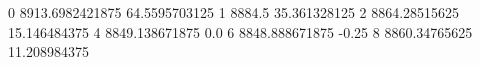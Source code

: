 0 8913.6982421875 64.5595703125
1 8884.5 35.361328125
2 8864.28515625 15.146484375
4 8849.138671875 0.0
6 8848.888671875 -0.25
8 8860.34765625 11.208984375
